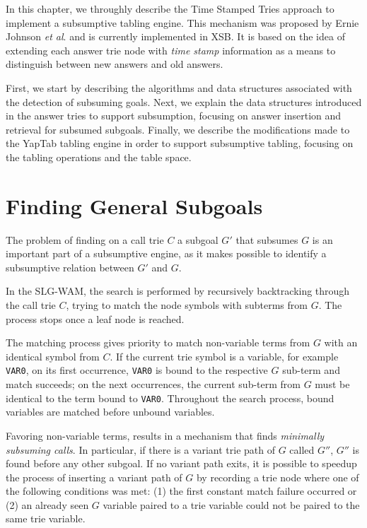 In this chapter, we throughly describe the Time Stamped Tries approach
to implement a subsumptive tabling engine. This mechanism was proposed by
Ernie Johnson \textit{et al}. \cite{Johnson-99} and is currently implemented in XSB.
It is based on the idea of extending each answer trie node with \textit{time stamp}
information as a means to distinguish between new answers and old answers.

First, we start by describing the algorithms and data structures associated
with the detection of subsuming goals. Next, we explain the data structures
introduced in the answer tries to support subsumption, focusing on answer insertion
and retrieval for subsumed subgoals. Finally, we describe the modifications made to the YapTab
tabling engine in order to support subsumptive tabling, focusing on the tabling operations and the table space.

\section{Finding General Subgoals}\label{sec:lookup_subsuming}

The problem of finding on a call trie $C$ a subgoal $G'$ that subsumes $G$ 
is an important part of a subsumptive engine, as it makes possible to identify
a subsumptive relation between $G'$ and $G$.

In the SLG-WAM, the search is performed by recursively backtracking through the call trie $C$, trying
to match the node symbols with subterms from $G$. The process stops once a leaf node is reached.

The matching process gives priority to match non-variable terms from $G$
with an identical symbol from $C$.
If the current trie symbol is a variable, for example \texttt{VAR0}, on its first occurrence, \texttt{VAR0}
is bound to the respective $G$ sub-term
and match succeeds; on the next occurrences, the current sub-term from $G$ must
be identical to the term bound to \texttt{VAR0}. Throughout the search process, bound variables are
matched before unbound variables.

Favoring non-variable terms, results in a mechanism that finds \textit{minimally subsuming calls}.
In particular, if there is a variant trie path of $G$ called $G''$, $G''$ is found before any other subgoal.
If no variant path exits, it is possible to speedup the process of inserting a variant path of $G$
by recording a trie node where one of the following conditions was met: (1) the first constant match
failure occurred or (2) an already seen $G$ variable paired to a trie variable could
not be paired to the same trie variable.

